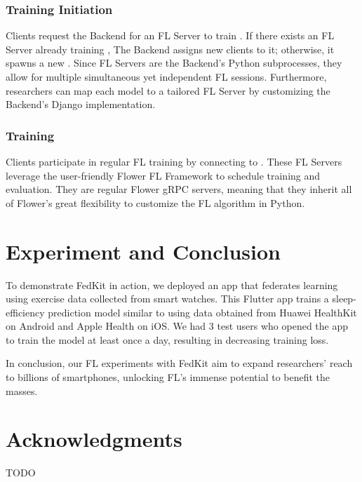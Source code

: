 \documentclass[letterpaper]{article} %
\begin{document}
\subsubsection{Training Initiation}
Clients request the Backend for an FL Server \fs{} to train \model.
If there exists an FL Server already training \model,
The Backend assigns new clients to it;
otherwise, it spawns a new \fs.
Since FL Servers are the Backend's Python subprocesses,
they allow for multiple simultaneous yet independent FL sessions.
Furthermore, researchers can map each model to a tailored FL Server by
customizing the Backend's Django implementation.

\subsubsection{Training}
Clients participate in regular FL training by connecting to \fs.
These FL Servers leverage the user-friendly Flower FL Framework to
schedule training and evaluation.
They are regular Flower gRPC servers, meaning that
they inherit all of Flower's great flexibility to customize the FL algorithm in
Python.

\section{Experiment and Conclusion}
To demonstrate FedKit in action,
we deployed an app that federates learning using exercise data collected from
smart watches.
This Flutter app trains a sleep-efficiency prediction model similar to \cite{khoa2022fedmcrnn}
using data obtained from Huawei HealthKit
on Android and Apple Health on iOS.
We had 3 test users who opened the app to train the model at least once a day,
resulting in decreasing training loss.

In conclusion, our FL experiments with FedKit aim to
expand researchers' reach to billions of smartphones,
unlocking FL's immense potential to benefit the masses.

\appendix

\section*{Acknowledgments}
TODO

\bigskip


\end{document}
